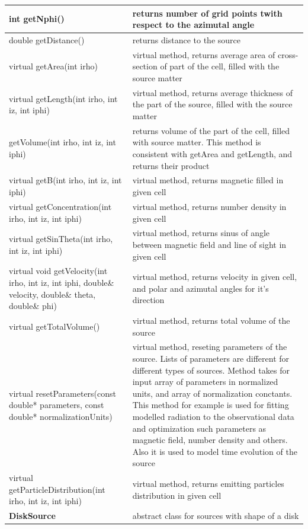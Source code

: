 \begin{small}
\begin{xtabular}{|p{0.5\textwidth}|p{0.5\textwidth}|}
		\hline
		int getNphi() & returns number of grid points twith respect to the azimutal angle\\
		\hline
		double getDistance() & returns distance to the source\\
		\hline
		virtual getArea(int irho) & virtual method, returns average area of cross-section of part of the cell, filled with the source matter\\
		\hline
		virtual getLength(int irho, int iz, int iphi) & virtual method, returns average thickness of the part of the source, filled with the source matter\\
		\hline
		getVolume(int irho, int iz, int iphi) & returns volume of the part of the cell, filled with source matter. This method is consistent with getArea and getLength, and returns their product\\
		\hline
		virtual getB(int irho, int iz, int iphi) & virtual method, returns magnetic filled in given cell\\
		\hline
		virtual getConcentration(int irho, int iz, int iphi) & virtual method, returns number density in given cell\\
		\hline
		virtual getSinTheta(int irho, int iz, int iphi) & virtual method, returns sinus of angle between magnetic field and line of sight in given cell\\
		\hline
		virtual void getVelocity(int irho, int iz, int iphi, double\& velocity, double\& theta, double\& phi) &
		virtual method, returns velocity in given cell, and polar and azimutal angles for it's direction\\
		\hline
		virtual getTotalVolume() & virtual method, returns total volume of the source\\
		\hline
		virtual resetParameters(const double* parameters, const double* normalizationUnits) &
		virtual method, reseting parameters of the source. Lists of parameters are different for different types of sources. Method takes for input array of parameters in normalized units, and array of normalization conctants. This method for example is used for fitting modelled radiation to the observational data and optimization such parameters as magnetic field, number density and others. Also it is used to model time evolution of the source\\
		\hline
		virtual getParticleDistribution(int irho, int iz, int iphi) & virtual method, returns emitting particles distribution in given cell\\
		\hline
		\textbf{DiskSource} & abstract class for sources with shape of a disk\\

\end{xtabular}
\end{small}
